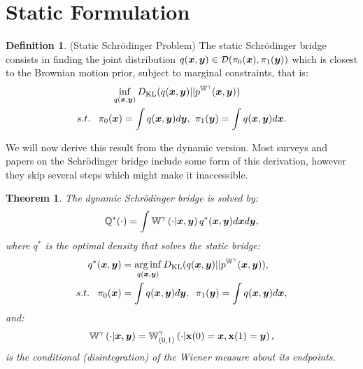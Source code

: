 \documentclass[a4paper,12pt,twoside,openright]{report}
\newtheorem{theorem}{Theorem}
\theoremstyle{definition}
\newtheorem{definition}{Definition}[section]
\begin{document}
\section{Static Formulation}
\begin{definition}\label{def:static_bridge}
    (Static Schrödinger Problem) The static Schrödinger bridge consists in finding the joint distribution $q({\bm{x}}, {\bm{y}}) \in {\mathcal{D}}(\pi_0({\bm{x}}), \pi_1({\bm{y}}))$ which is closest to the Brownian motion prior, subject to marginal constraints, that is:
    \begin{align}\label{eq:static_bridge}
        \inf_{q({\bm{x}},{\bm{y}})} D_{\mathrm{KL}} (q({\bm{x}},{\bm{y}})  &|| p^{\mathbb{W}^{\gamma}}({\bm{x}},{\bm{y}})) \nonumber \\
        s.t. \;\;\; \pi_0({\bm{x}}) = \int q({\bm{x}},{\bm{y}}) d{\bm{y}}, &\;\;\pi_1({\bm{y}}) = \int q({\bm{x}},{\bm{y}}) d{\bm{x}}.
    \end{align}
\end{definition}
We will now derive this result from the dynamic version. Most surveys and papers on the Schrödinger bridge include some form of this derivation, however they skip several steps which might make it inaccessible. 
\begin{theorem}\citep{follmer1988random}
    The dynamic Schrödinger bridge is solved by:
\begin{align}
    {\mathbb{Q}}^{*} (\cdot) =  \int \mathbb{W}^{\gamma} \left(\cdot | {\bm{x}}, {\bm{y}}\right)  q^{*}({\bm{x}},{\bm{y}}) d{\bm{x}} d{\bm{y}} ,
\end{align}
    where $q^*$ is the optimal density that solves the static bridge:
    \begin{align*}
        q^{*}({\bm{x}},{\bm{y}})& = \operatorname*{arg\,inf}_{q({\bm{x}},{\bm{y}})} D_{\mathrm{KL}} (q({\bm{x}},{\bm{y}})  || p^{\mathbb{W}^{\gamma}}({\bm{x}},{\bm{y}})),  \\
        s.t. \;\;\; \pi_0({\bm{x}}) &= \int q({\bm{x}},{\bm{y}}) d{\bm{y}}, \;\;\pi_1({\bm{y}}) = \int q({\bm{x}},{\bm{y}}) d{\bm{x}},
    \end{align*}
    and:
    \begin{align*}
        \mathbb{W}^{\gamma} \left(\cdot | {\bm{x}}, {\bm{y}}\right)  = \mathbb{W}_{(0,1)}^{\gamma}\left(\cdot | {\mathbf{x}}(0) ={\bm{x}}, {\mathbf{x}}(1) ={\bm{y}}\right),
    \end{align*}
    is the conditional (disintegration) of the Wiener measure about its endpoints.
\end{theorem} %
\end{document}
